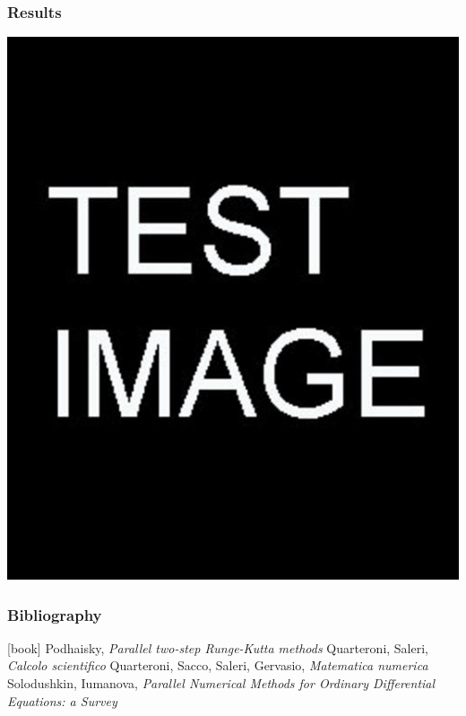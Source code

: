\documentclass{beamer}
\begin{document}
\begin{frame} %
	\frametitle{Results}
	\includegraphics[scale=0.2]{etc/test.jpg}
\end{frame}


\begin{frame} %
	\frametitle{Bibliography}
	\begin{thebibliography}{9}
		 Podhaisky, \textit{Parallel two-step Runge-Kutta methods}
		 Quarteroni, Saleri, \textit{Calcolo scientifico}
		 Quarteroni, Sacco, Saleri, Gervasio, \textit{Matematica numerica}
		 Solodushkin, Iumanova, \textit{Parallel Numerical Methods for Ordinary Differential Equations: a Survey}	
	\end{thebibliography}
\end{frame}
\end{document}
